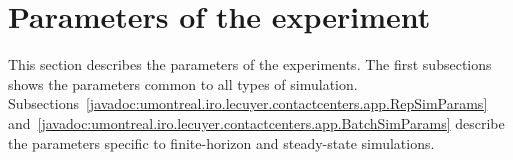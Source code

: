 \section{Parameters of the experiment}
\label{sec:msksimparams}

This section describes the parameters of the experiments.
The first subsections shows the parameters common to all types of
simulation.
Subsections~\ref{javadoc:umontreal.iro.lecuyer.contactcenters.app.RepSimParams}
and~\ref{javadoc:umontreal.iro.lecuyer.contactcenters.app.BatchSimParams}
describe the parameters specific to finite-horizon and steady-state
simulations.
